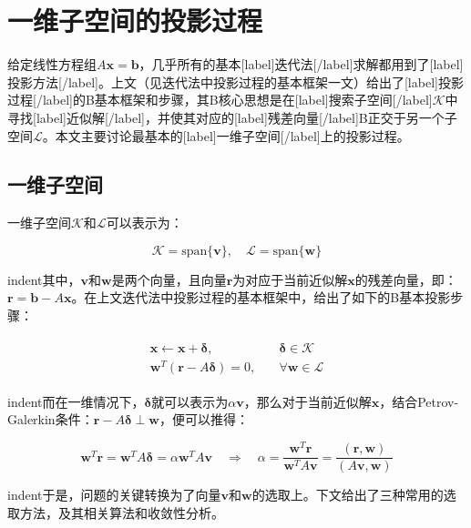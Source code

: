 \documentclass[UTF8,nofonts]{ctexart}
\begin{document}
\section*{一维子空间的投影过程}

给定线性方程组$A\boldsymbol{x}=\boldsymbol{b}$，几乎所有的基本[label]迭代法[/label]求解都用到了[label]投影方法[/label]。上文（见迭代法中投影过程的基本框架一文）给出了[label]投影过程[/label]的B基本框架和步骤，其B核心思想是在[label]搜索子空间[/label]$\mathcal{K}$中寻找[label]近似解[/label]，并使其对应的[label]残差向量[/label]B正交于另一个子空间$\mathcal{L}$。本文主要讨论最基本的[label]一维子空间[/label]上的投影过程。

\subsection*{一维子空间}

一维子空间$\mathcal{K}$和$\mathcal{L}$可以表示为：

\[\mathcal{K}=\text{span}\{\boldsymbol{v}\},\quad\mathcal{L}=\text{span}\{\boldsymbol{w}\}\]

indent其中，$\boldsymbol{v}$和$\boldsymbol{w}$是两个向量，且向量$\boldsymbol{r}$为对应于当前近似解$\boldsymbol{x}$的残差向量，即：$\boldsymbol{r}=\boldsymbol{b}-A\boldsymbol{x}$。在上文迭代法中投影过程的基本框架中，给出了如下的B基本投影步骤：

\begin{align*}
\begin{split}
\boldsymbol{x}\gets\boldsymbol{x}+\boldsymbol{\delta},&\quad\boldsymbol{\delta}\in\mathcal{K} \\
\boldsymbol{w}^T(\boldsymbol{r}-A\boldsymbol{\delta})=0,&\quad\forall\boldsymbol{w}\in\mathcal{L} \end{split} \end{align*}

indent而在一维情况下，$\boldsymbol{\delta}$就可以表示为$\alpha\boldsymbol{v}$，那么对于当前近似解$\boldsymbol{x}$，结合Petrov-Galerkin条件：$\boldsymbol{r}-A\boldsymbol{\delta}\perp\boldsymbol{w}$，便可以推得：

\[
\boldsymbol{w}^T\boldsymbol{r}=\boldsymbol{w}^TA\boldsymbol{\delta}=\alpha\boldsymbol{w}^TA\boldsymbol{v}\quad\Longrightarrow\quad\alpha=\dfrac{\boldsymbol{w}^T\boldsymbol{r}}{\boldsymbol{w}^TA\boldsymbol{v}}=\dfrac{(\boldsymbol{r},\boldsymbol{w})}{(A\boldsymbol{v},\boldsymbol{w})}
\]

indent于是，问题的关键转换为了向量$\boldsymbol{v}$和$\boldsymbol{w}$的选取上。下文给出了三种常用的选取方法，及其相关算法和收敛性分析。
\end{document}
